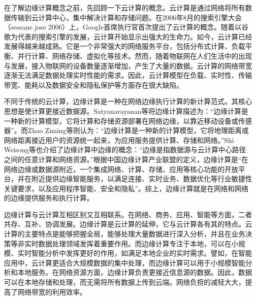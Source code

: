 \documentclass[UTF8,12pt,twoside,a4paper]{ctexart} %
\begin{document}
\begin{center}
\end{center}
\vspace*{10pt}
\begin{flushleft}
\end{flushleft}
\indent\setlength{\parindent}{2em}%
\songti
\hspace{1.6em}%
在了解边缘计算概念之前，先回顾一下云计算的概念。云计算是通过网络将所有数据传输到云计算中心，集中解决计算和存储问题。在2006年8月的搜索引擎大会（sessane jose 2006）上，Google首席执行官首次提出了云计算的概念。随着以谷歌为代表的搜索引擎的发展，云计算开始显示出强大的生命力。如今，云计算已经发展得越来越成熟。它是一个非常强大的网络服务平台，包括分布式计算、负载平衡、并行计算、网络存储、虚拟化等技术。然而，随着物联网在人们生活中的出现与发展，接入物联网的设备数量逐渐增加，产生了大量的数据。云计算的网络带宽逐渐无法满足数据处理实时性能的需求。因此，云计算模型在负载、实时性、传输带宽、能耗以及数据安全和隐私保护等方面存在很大缺陷。

不同于传统的云计算，边缘计算是一种在网络边缘执行计算的新计算范式。其核心思想是使计算更接近数据源。Satyanarayanan等\cite{RN3}将边缘计算描述为：“边缘计算是一种新的计算模型，它将计算和存储资源部署在网络边缘，以靠近移动设备或传感器”。而Zhao Ziming等\cite{RN4}则认为：“边缘计算是一种新的计算模型，它将地理距离或网络距离接近用户的资源统一起来，为应用服务提供计算、存储和网络。”Shi Weisong等\cite{RN5}也介绍了边缘计算中边缘的概念：“边缘是指数据源与云计算中心路径之间的任意计算和网络资源。”根据中国边缘计算产业联盟的定义\cite{RN6}，边缘计算是“在网络边缘或数据源附近，一个集成网络、计算、存储、应用等核心功能的开放平台，并在附近提供边缘智能服务，以满足连接、实时业务、数据优化等行业敏捷性关键要求，以及应用程序智能、安全和隐私”。综上，边缘计算就是在网络和网络的边缘提供服务和执行计算。

边缘计算与云计算互相区别又互相联系。在网络、商务、应用、智能等方面，二者共存、互补、协调发展。边缘计算是云计算的延伸，它与云计算各有其的特点。云计算的主要特点是能够把握全局，能够处理大量数据进行深入分析，并且在业务决策等非实时数据处理领域发挥着重要作用。而边缘计算专注于本地，可以在小规模、实时智能分析中发挥更好的作用，如满足本地企业的实时需求。譬如，在智能应用中，云计算更适合大规模数据的集中处理，而边缘计算可以用于小规模智能分析和本地服务。在网络资源方面，边缘计算负责更接近信息源的数据。因此，数据可以在本地存储和处理，而无需将所有数据上传到云端。网络负担的减轻大大，提高了网络带宽的利用效率。
\end{document}
